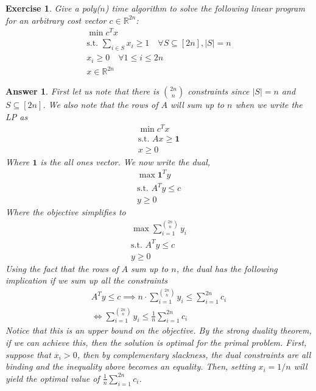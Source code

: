 \documentclass[12pt]{article}
\theoremstyle{colon}
\newtheorem{exercise}{Exercise}
\newtheorem*{answer}{Answer}
\begin{document}
\clearpage

\begin{exercise}
  Give a poly($n$) time algorithm to solve the following linear program for an arbitrary cost vector $c \in \mathbb{R}^{2n}$:
  \begin{gather*}
    \min c^T x \\
    \text{s.t. } \sum_{i \in  S} x_i \geq 1 \quad \forall S \subseteq [2n], \lvert S \rvert = n \\
    x_i \geq 0 \quad \forall 1 \leq i \leq 2n \\
    x \in \mathbb{R}^{2n}
  \end{gather*}
\end{exercise}

\begin{answer}
  First let us note that there is $\binom{2n}{n}$ constraints since $\lvert S \rvert = n$ and $S \subseteq [2n]$. We also note that the rows of $A$ will sum up to $n$ when we write the LP as
  \begin{gather*}
    \min c^T x \\
    \text{s.t. } A x \geq \textbf{1} \\
    x \geq 0
  \end{gather*}
  Where $\textbf{1}$ is the all ones vector. We now write the dual,
  \begin{gather*}
    \max \textbf{1}^T y \\
    \text{s.t. } A^T y \leq c \\
    y \geq 0
  \end{gather*}
  Where the objective simplifies to
  \begin{gather*}
    \max \sum_{i = 1}^{\binom{2n}{n}} y_i \\
    \text{s.t. } A^T y \leq c \\
    y \geq 0
  \end{gather*}
  Using the fact that the rows of $A$ sum up to $n$, the dual has the following implication if we sum up all the constraints
  \begin{gather*}
    A^T y \leq c \implies n \cdot \sum_{i = 1}^{\binom{2n}{n}} y_i \leq \sum_{i = 1}^{2n} c_i \\
    \Longleftrightarrow \sum_{i = 1}^{\binom{2n}{n}} y_i \leq \frac{1}{n} \sum_{i = 1}^{2n} c_i
  \end{gather*}
  Notice that this is an upper bound on the objective. By the strong duality theorem, if we can achieve this, then the solution is optimal for the primal problem. First, suppose that $x_i > 0$, then by complementary slackness, the dual constraints are all binding and the inequality above becomes an equality. Then, setting $x_i = 1/n$ will yield the optimal value of $\frac{1}{n} \sum_{i = 1}^{2n} c_i$.


\end{answer}
\end{document}
